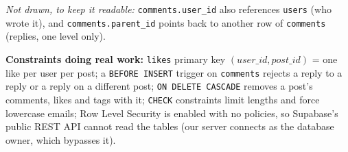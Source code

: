 \documentclass[10pt,a4paper]{article}
\newcommand{\code}[1]{\texttt{#1}}
\begin{document}
\begin{center}
{}
\end{center}
\scriptsize{\emph{Not drawn, to keep it readable:} \code{comments.user\_id} also references \code{users} (who wrote it), and \code{comments.parent\_id} points back to another row of \code{comments} (replies, one level only).}\normalsize

\textbf{Constraints doing real work:} \code{likes} primary key $(user\_id, post\_id)$ = one like per user per post; a \code{BEFORE INSERT} trigger on \code{comments} rejects a reply to a reply or a reply on a different post;
\code{ON DELETE CASCADE} removes a post's comments, likes and tags with it; \code{CHECK} constraints limit lengths and force lowercase emails; Row Level Security is enabled with no policies, so Supabase's public REST API cannot read the tables
(our server connects as the database owner, which bypasses it).
\end{document}
